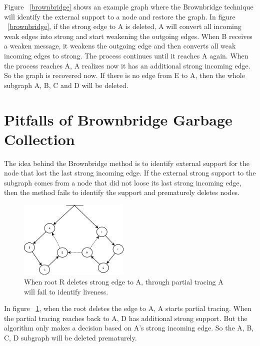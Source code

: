 Figure ~\ref{brownbridge} shows an example graph where the Brownbridge technique will identify the external support to a node and restore the graph. In figure ~\ref{brownbridge}, if the strong edge to A is deleted, A will convert all incoming weak edges into strong and start weakening the outgoing edges. When B receives a weaken message, it weakens the outgoing edge and then converts all weak incoming edges to strong. The process continues until it reaches A again. When the process reaches A, A realizes now it has an additional strong incoming edge. So the graph is recovered now. If there is no edge from E to A, then the whole subgraph A, B, C and D will be deleted.


\section{Pitfalls of Brownbridge Garbage Collection}
The idea behind the Brownbridge method is to identify external support for the node that lost the last strong incoming edge. If the external strong support to the subgraph comes from a node that did not loose its last strong incoming edge, then the method fails to identify the support and prematurely deletes nodes.  

\begin{figure}[!t]
	\centering
	\includegraphics[width=0.47\textwidth]{figs/brownbridgefail}
	\caption{When root R deletes strong edge to A, through partial tracing A will fail to identify liveness.}
	\label{brownbridgefail}
\end{figure}

In figure ~\ref{brownbridgefail}, when the root deletes the edge to A, A starts partial tracing. When the partial tracing reaches back  to A, D has additional strong support. But the algorithm only makes a decision based on A's strong incoming edge. So the A, B, C, D subgraph will be deleted prematurely.

